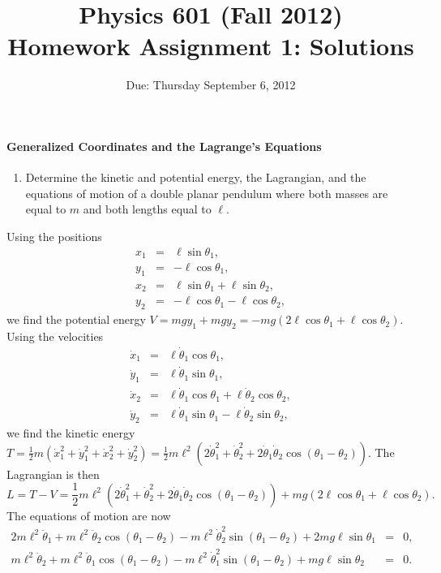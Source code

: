 \documentclass[letterpaper,11pt]{article}
\title{Physics 601 (Fall 2012) \\ Homework Assignment 1: Solutions}
\date{Due: Thursday September 6, 2012}
\begin{document}
\maketitle

\paragraph*{Generalized Coordinates and the Lagrange's Equations}
\begin{enumerate}
 \item Determine the kinetic and potential energy, the Lagrangian, and the equations of motion of a double planar pendulum where both masses are equal to $m$ and both lengths equal to $\ell$.
\end{enumerate}
Using the positions
\begin{eqnarray*}
 x_1 & = & \ell\sin\theta_1, \\
 y_1 & = & - \ell\cos\theta_1, \\
 x_2 & = & \ell\sin\theta_1 + \ell\sin\theta_2, \\
 y_2 & = & - \ell\cos\theta_1 - \ell\cos\theta_2,
\end{eqnarray*}
we find the potential energy $V = mgy_1 + mgy_2 = -mg(2\ell\cos\theta_1 + \ell\cos\theta_2)$.  Using the velocities
\begin{eqnarray*}
 \dot{x}_1 & = & \ell\dot{\theta}_1\cos\theta_1, \\
 \dot{y}_1 & = & \ell\dot{\theta}_1\sin\theta_1, \\
 \dot{x}_2 & = & \ell\dot{\theta}_1\cos\theta_1 + \ell\dot{\theta}_2\cos\theta_2, \\
 \dot{y}_2 & = & \ell\dot{\theta}_1\sin\theta_1 - \ell\dot{\theta}_2\sin\theta_2,
\end{eqnarray*}
we find the kinetic energy $T = \frac{1}{2}m\left(\dot{x}_1^2 + \dot{y}_1^2 + \dot{x}_2^2 + \dot{y}_2^2\right) = \frac{1}{2}m\ell^2\left(2\dot{\theta}_1^2 + \dot{\theta}_2^2 + 2 \dot{\theta}_1 \dot{\theta}_2 \cos(\theta_1 - \theta_2)\right)$.  The Lagrangian is then
\begin{equation*}
 L = T - V = \frac{1}{2}m\ell^2\left(2\dot{\theta}_1^2 + \dot{\theta}_2^2 + 2 \dot{\theta}_1 \dot{\theta}_2 \cos(\theta_1 - \theta_2)\right) + mg(2\ell\cos\theta_1 + \ell\cos\theta_2).
\end{equation*}
The equations of motion are now
\begin{eqnarray*}
 2m\ell^2\ddot{\theta}_1 + m\ell^2\ddot{\theta}_2\cos(\theta_1 - \theta_2) - m\ell^2\dot{\theta}_2^2\sin(\theta_1 - \theta_2) + 2mg\ell\sin\theta_1 & = & 0, \\
 m\ell^2\ddot{\theta}_2 + m\ell^2\ddot{\theta}_1\cos(\theta_1 - \theta_2) - m\ell^2\dot{\theta}_1^2\sin(\theta_1 - \theta_2) + mg\ell\sin\theta_2 & = & 0.
\end{eqnarray*}
\end{document}
